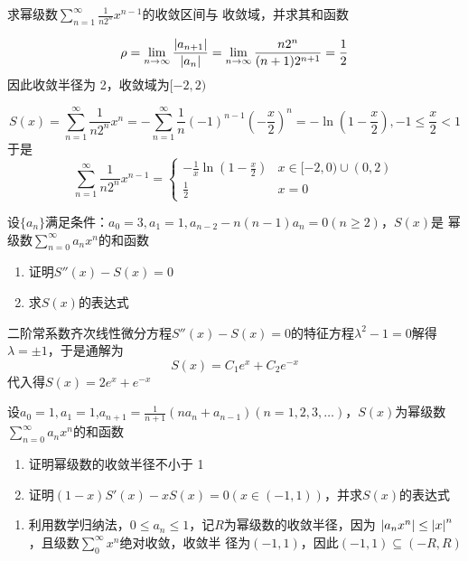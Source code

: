 \documentclass{article}
\begin{document}
\begin{examplle}[]
求幂级数\(\displaystyle \sum_{n=1}^\infty\frac{1}{n2^n}x^{n-1}\)的收敛区间与
收敛域，并求其和函数

\begin{equation*}
\rho=\lim_{n\to\infty}\frac{\abs{a_{n+1}}}{\abs{a_n}}=\lim_{n\to\infty}
\frac{n2^n}{(n+1)2^{n+1}}=\frac{1}{2}
\end{equation*}
因此收敛半径为 2，收敛域为\([-2,2)\)

\begin{equation*}
S(x)=\sum_{n=1}^\infty\frac{1}{n2^n}x^n=
-\sum_{n=1}^\infty\frac{1}{n}(-1)^{n-1}\left(-\frac{x}{2}\right)^n=
-\ln(1-\frac{x}{2}),-1\le\frac{x}{2}<1
\end{equation*}
于是
\begin{equation*}
\sum_{n=1}^\infty\frac{1}{n2^n}x^{n-1}=
\begin{cases}
-\frac{1}{x}\ln\left(1-\frac{x}{2}\right)&x\in[-2,0)\cup(0,2)\\
\frac{1}{2}&x=0
\end{cases}
\end{equation*}
\end{examplle}

\begin{examplle}[]
设\(\{a_n\}\)满足条件：\(a_0=3,a_1=1,a_{n-2}-n(n-1)a_n=0(n\ge2)\)，\(S(x)\)是
幂级数\(\displaystyle \sum_{n=0}^\infty a_nx^n\)的和函数
\begin{enumerate}
\item 证明\(S''(x)-S(x)=0\)
\item 求\(S(x)\)的表达式
\end{enumerate}


二阶常系数齐次线性微分方程\(S''(x)-S(x)=0\)的特征方程\(\lambda^2-1=0\)解得
\(\lambda=\pm1\)，于是通解为
\begin{equation*}
S(x)=C_1e^x+C_2e^{-x}
\end{equation*}
代入得\(S(x)=2e^x+e^{-x}\)
\end{examplle}

\begin{examplle}[]
设\(a_0=1,a_1=1\),\(\displaystyle
   a_{n+1}=\frac{1}{n+1}(na_n+a_{n-1})(n=1,2,3,\dots)\)，\(S(x)\)为幂级数
\(\displaystyle \sum_{n=0}^\infty a_nx^n\)的和函数
\begin{enumerate}
\item 证明幂级数的收敛半径不小于 1
\item 证明\((1-x)S'(x)-xS(x)=0(x\in(-1,1))\)，并求\(S(x)\)的表达式
\end{enumerate}


\begin{enumerate}
\item 利用数学归纳法，\(0\le a_n\le1\)，记\(R\)为幂级数的收敛半径，因为
\(\abs{a_nx^n}\le\abs{x}^n\)，且级数\(\sum_0^\infty x^n\)绝对收敛，收敛半
径为\((-1,1)\)，因此\((-1,1)\subseteq(-R,R)\)
\end{enumerate}
\end{examplle}
\end{document}

